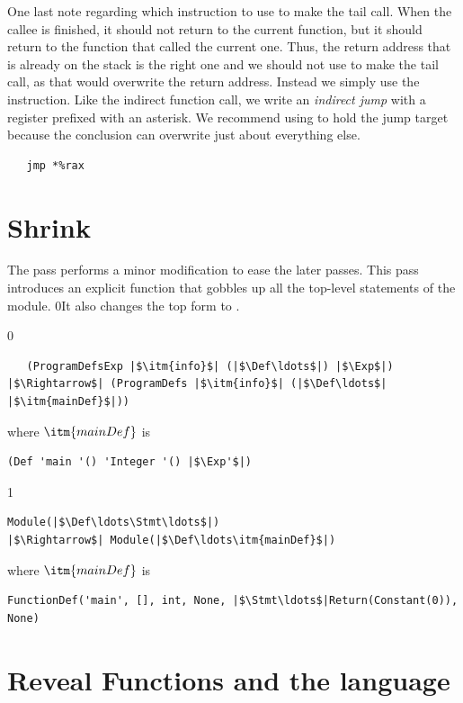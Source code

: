 \documentclass[7x10]{TimesAPriori_MIT}%
\def\racketEd{0}
\def\pythonEd{1}
\def\edition{0}
\newcommand{\racket}[1]{{\if\edition\racketEd{#1}\fi}}
\numberwithin{theorem}{chapter}
\numberwithin{definition}{chapter}
\numberwithin{equation}{chapter}
\begin{document}
One last note regarding which instruction to use to make the tail
call. When the callee is finished, it should not return to the current
function, but it should return to the function that called the current
one. Thus, the return address that is already on the stack is the
right one and we should not use  to make the tail call, as
that would overwrite the return address. Instead we simply use the
 instruction. Like the indirect function call, we write an
\emph{indirect jump} with a register
prefixed with an asterisk.  We recommend using  to hold the
jump target because the conclusion can overwrite just about everything
else.
\begin{lstlisting}
   jmp *%rax
\end{lstlisting}


\section{Shrink \LangFun{}}
\label{sec:shrink-r4}

The  pass performs a minor modification to ease the
later passes. This pass introduces an explicit  function
that gobbles up all the top-level statements of the module.
%
\racket{It also changes the top  form to
\code{ProgramDefs}.}

{\if\edition\racketEd  
\begin{lstlisting}
   (ProgramDefsExp |$\itm{info}$| (|$\Def\ldots$|) |$\Exp$|)
|$\Rightarrow$| (ProgramDefs |$\itm{info}$| (|$\Def\ldots$| |$\itm{mainDef}$|))
\end{lstlisting}
where $\itm{mainDef}$ is
\begin{lstlisting}
(Def 'main '() 'Integer '() |$\Exp'$|)
\end{lstlisting}
\fi}
{\if\edition\pythonEd
\begin{lstlisting}
Module(|$\Def\ldots\Stmt\ldots$|)
|$\Rightarrow$| Module(|$\Def\ldots\itm{mainDef}$|)
\end{lstlisting}
where $\itm{mainDef}$ is
\begin{lstlisting}
FunctionDef('main', [], int, None, |$\Stmt\ldots$|Return(Constant(0)), None)
\end{lstlisting}
\fi}

\section{Reveal Functions and the \LangFunRef{} language}
\label{sec:reveal-functions-r4}
\end{document}
